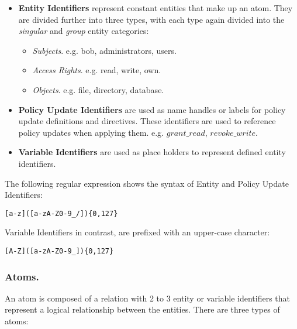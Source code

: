 \documentclass[11pt]{llncs}
\begin{document}
        \begin{itemize}
          \item
            {\bf Entity Identifiers} represent constant entities that make
            up an atom. They are divided further into three types, with each
            type again divided into the {\em singular} and {\em group} entity
            categories:

            \begin{itemize}
              \item
                {\em Subjects}. e.g. bob, administrators, users.
              \item
                {\em Access Rights}. e.g. read, write, own.
              \item
                {\em Objects}. e.g. file, directory, database.
            \end{itemize}
          \vspace{1mm}
          \item
            {\bf Policy Update Identifiers} are used as name handles or labels
            for policy update definitions and directives. These identifiers are
            used to reference policy updates when applying them. e.g.
            $grant\_read$, $revoke\_write$.

          \vspace{1mm}
          \item
            {\bf Variable Identifiers} are used as place holders to represent
            defined entity identifiers.
        \end{itemize}

        The following regular expression shows the syntax of Entity and
        Policy Update Identifiers:

        \begin{verbatim}[a-z]([a-zA-Z0-9_/]){0,127}\end{verbatim}

        Variable Identifiers in contrast, are prefixed with an upper-case
        character:

        \begin{verbatim}[A-Z]([a-zA-Z0-9_]){0,127}\end{verbatim}

      \subsubsection{Atoms.}

        An atom is composed of a relation with 2 to 3 entity or variable
        identifiers that represent a logical relationship between the entities.
        There are three types of atoms:
\end{document}
